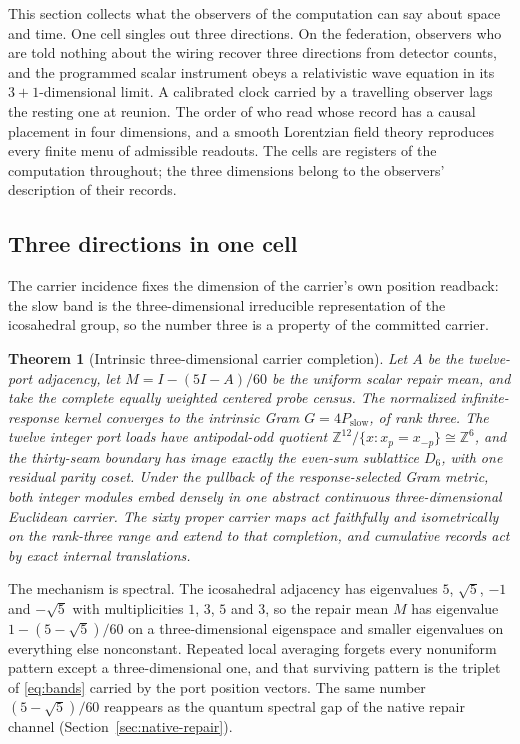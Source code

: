 \documentclass[11pt]{article}
\newtheorem{theorem}{Theorem}[section]
\theoremstyle{definition}
\theoremstyle{remark}
\begin{document}
This section collects what the observers of the computation can say
about space and time. One cell singles out three directions. On the
federation, observers who are told nothing about the wiring recover
three directions from detector counts, and the programmed scalar
instrument obeys a relativistic wave equation in its
$3{+}1$-dimensional limit. A calibrated clock carried by a travelling
observer lags the resting one at reunion. The order of who read whose
record has a causal placement in four dimensions, and a smooth
Lorentzian field theory reproduces every finite menu of admissible
readouts. The cells are
registers of the computation throughout; the three dimensions belong to
the observers' description of their records.

\subsection{Three directions in one cell}
\label{sec:rank-three}

The carrier incidence fixes the dimension of the carrier's own position
readback: the slow band is the three-dimensional irreducible representation
of the icosahedral group, so the number three is a property of the committed
carrier.

\begin{theorem}[Intrinsic three-dimensional carrier completion]
\label{thm:rank-three}
Let $A$ be the twelve-port adjacency, let $M=I-(5I-A)/60$ be the uniform scalar repair mean, and take the complete equally weighted centered probe
census. The normalized infinite-response kernel converges to the intrinsic
Gram $G=4P_{\mathrm{slow}}$, of rank three. The twelve integer port loads have
antipodal-odd quotient $\mathbb Z^{12}/\{x:x_p=x_{-p}\}\cong\mathbb Z^6$, and
the thirty-seam boundary has image exactly the even-sum sublattice $D_6$, with
one residual parity coset. Under the pullback of the response-selected Gram
metric, both integer modules embed densely in one abstract continuous
three-dimensional Euclidean carrier. The sixty proper carrier maps act
faithfully and isometrically on the rank-three range and extend to that
completion, and cumulative records act by exact internal translations.
\end{theorem}

The mechanism is spectral. The icosahedral adjacency has eigenvalues $5$,
$\sqrt5$, $-1$ and $-\sqrt5$ with multiplicities $1$, $3$, $5$ and $3$, so the
repair mean $M$ has eigenvalue $1-(5-\sqrt5)/60$ on a three-dimensional
eigenspace and smaller eigenvalues on everything else nonconstant. Repeated local averaging forgets every nonuniform pattern except a
three-dimensional one, and that surviving pattern is the triplet of
\eqref{eq:bands} carried by the port position vectors. The same
number $(5-\sqrt5)/60$ reappears as the quantum spectral gap of the native
repair channel (Section~\ref{sec:native-repair}).
\end{document}
